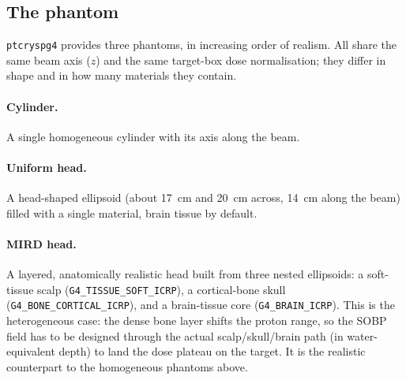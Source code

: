 \documentclass[11pt]{article}
\newcommand{\Cl}[1]{{}^{#1}\mathrm{C}}
\newcommand{\Ox}[1]{{}^{#1}\mathrm{O}}
\begin{document}
\subsection{The phantom}
\label{sec:phantom}
\texttt{ptcryspg4} provides three phantoms, in increasing order of realism. All
share the same beam axis ($z$) and the same target-box dose normalisation; they
differ in shape and in how many materials they contain.

\paragraph{Cylinder.} A single homogeneous cylinder with its axis
along the beam. 

\paragraph{Uniform head.} A head-shaped ellipsoid (about \SI{17}{cm} and
\SI{20}{cm} across, \SI{14}{cm} along the beam) filled with a single material, brain
tissue by default. 

\paragraph{MIRD head.} A layered, anatomically realistic head built from three
nested ellipsoids: a soft-tissue scalp (\texttt{G4\_TISSUE\_SOFT\_ICRP}), a
cortical-bone skull (\texttt{G4\_BONE\_CORTICAL\_ICRP}), and a brain-tissue core
(\texttt{G4\_BRAIN\_ICRP}). This is the heterogeneous case: the dense bone layer
shifts the proton range, so the SOBP field has to be designed through the actual
scalp/skull/brain path (in water-equivalent depth) to land the dose plateau on the
target. It is the realistic counterpart to the homogeneous phantoms above.
\end{document}
